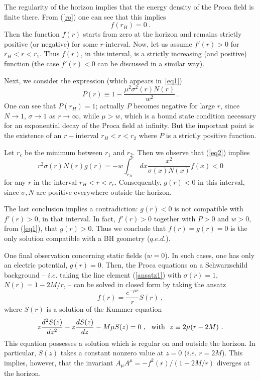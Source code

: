 \documentclass{article}
\numberwithin{equation}{section}
\begin{document}
The regularity of the horizon implies that the energy density of the Proca field
is finite there.
From (\ref{ro}) one can see that this implies
 \begin{equation}
f(r_H)=0\ .
\end{equation}
Then the function $f(r)$ starts from zero at the horizon 
and remains strictly positive (or negative) for some $r$-interval.
Now, let us assume $f'(r)>0$ for 
$r_H<r<r_1$. Thus $f(r)$, in this interval, is a strictly increasing (and positive) function 
(the case $f'(r)<0$ can  be discussed in a similar way).

Next, we consider the expression (which appears in~\eqref{eq1}) 
 \begin{equation}
P(r)\equiv 1-\frac{\mu^2\sigma^2(r)N(r) }{w^2}\ .
\end{equation}
One can see that $P(r_H)=1$; actually $P$  
becomes negative for large $r$, since $N\to 1$, $\sigma\to 1$ as $r\to \infty$, while $\mu>w$, which is a bound state condition necessary for an exponential decay of the Proca field at infinity. But the important point is the existence of an $r-$interval
$r_H<r<r_2$ where $P$ is a strictly positive function.


Let $r_c$ be the minimum between $r_1$ and $r_2$.
Then   
  we observe that (\ref{eq2}) implies
\begin{equation}
 r^2\sigma(r)N(r)g(r)  =-w\int_{r_H}^r\ dx \frac{x^2}{\sigma(x)N(x)} f(x)<0 
\label{eq21}
\end{equation} 
for  any $r$ in the interval $r_H<r<r_c$. Consequently, $g(r)<0$ in this interval, since $\sigma,N$ are positive everywhere outside the horizon.

The last conclusion implies a contradiction: $g(r)<0$ is not compatible with $f'(r)>0$, in that interval. In fact, $f'(r)>0$ together with $P>0$ and $w>0$, from (\ref{eq1}), that $g(r)>0$. 
Thus we conclude that $f(r)=g(r)=0$ is the only solution compatible with a BH geometry ($q.e.d.$). 


One final observation concerning static fields ($w=0$). In such cases, one has only an electric potential, $g(r)=0$.
Then, the Proca equations  on a Schwarzschild
background -- $i.e.$ taking the line element (\ref{ansatz1}) 
with $\sigma(r)=1$, $N(r)=1-2M/r$, --
can be solved in closed form by taking the ansatz~\cite{Gottlieb:1984jg}
\begin{equation}
f(r)=\frac{e^{-\mu r}}{r}S(r) \ ,
\label{eqs1}
\end{equation} 
where $S(r)$ is a solution of the Kummer equation~\cite{Abramowitz} 
\begin{equation}
z\frac{d^2 S(z)}{dz^2}-z \frac{d S(z)}{dz}-M \mu S(z)=0\ ,~~{\rm with}~~z\equiv 2\mu(r-2M) \ .
\label{eqs2}
\end{equation} 
This equation possesses a solution which is regular on and outside the  horizon.
In particular, $S(z)$ takes a constant nonzero value at $z=0$ ($i.e.$ $r=2M$).
This implies, however, that the invariant $A_\mu A^\mu=-f^2(r)/(1-2M/r)$
diverges at the horizon.
\end{document}
